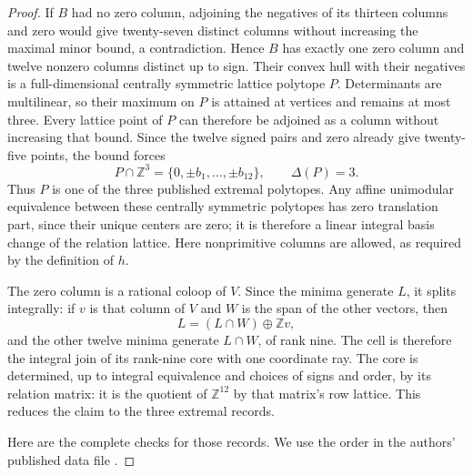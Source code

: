 \documentclass[11pt,a4paper]{article}
\theoremstyle{definition}
\begin{document}
\begin{proof}
If $B$ had no zero column, adjoining the negatives of its
thirteen columns and zero would give twenty-seven distinct
columns without increasing the maximal minor bound, a
contradiction. Hence $B$ has exactly one zero column and twelve
nonzero columns distinct up to sign. Their convex hull with
their negatives is a full-dimensional centrally symmetric
lattice polytope $P$. Determinants are multilinear, so their
maximum on $P$ is attained at vertices and remains at most
three. Every lattice point of $P$ can therefore be adjoined as
a column without increasing that bound. Since the twelve
signed pairs and zero already give twenty-five points, the
bound forces
\[
       P\cap\mathbb Z^3=\{0,\pm b_1,\ldots,\pm b_{12}\},
       \qquad \Delta(P)=3.                              \tag{TG.2}
\]
Thus $P$ is one of the three published extremal polytopes.
Any affine unimodular equivalence between these centrally
symmetric polytopes has zero translation part, since their
unique centers are zero; it is therefore a linear integral
basis change of the relation lattice.
Here nonprimitive columns are allowed, as required by the
definition of $h$.

The zero column is a rational coloop of $V$. Since the minima
generate $L$, it splits integrally: if $v$ is that column of
$V$ and $W$ is the span of the other vectors, then
\[
 L=(L\cap W)\oplus\mathbb Zv ,
\]
and the other twelve minima generate $L\cap W$, of rank nine.
The cell is therefore the integral join of its rank-nine core
with one coordinate ray. The core is determined, up to integral
equivalence and choices of signs and order, by its relation
matrix: it is the quotient of $\mathbb Z^{12}$ by that
matrix's row lattice. This reduces the claim to the three
extremal records.

Here are the complete checks for those records. We use the
order in the authors' published data file
.


\end{proof}
\end{document}
